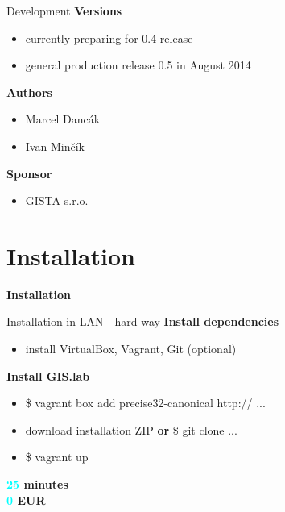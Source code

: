 \documentclass[12pt]{beamer}
\begin{document}
\begin{frame}{Development}
	\textbf{Versions}
	\begin{itemize}
		\item currently preparing for 0.4 release
		\item general production release 0.5 in August 2014
	\end{itemize}

	\textbf{Authors}
	\begin{itemize}
		\item Marcel Dancák
		\item Ivan Minčík
	\end{itemize}

	\textbf{Sponsor}
	\begin{itemize}
		\item GISTA s.r.o.
	\end{itemize}
\end{frame}


\section{Installation}
\begin{frame}
	\begin{center}
		\LARGE\textbf{Installation}	
	\end{center}
\end{frame}


\begin{frame}{Installation in LAN - hard way}
	\textbf{Install dependencies}
	\begin{itemize}
		\item install VirtualBox, Vagrant, Git (optional)
	\end{itemize}

	\textbf{Install GIS.lab}
	\begin{itemize}
		\item \$ vagrant box add precise32-canonical http:// ...
		\item download installation ZIP \textbf{or} \$ git clone ...
		\item \$ vagrant up
	\end{itemize}
	\begin{flushleft}
		\textbf{\textcolor{Cyan}{25} minutes} \\
		\textbf{\textcolor{Cyan}{0} EUR} \\
	\end{flushleft}
\end{frame}
\end{document}
